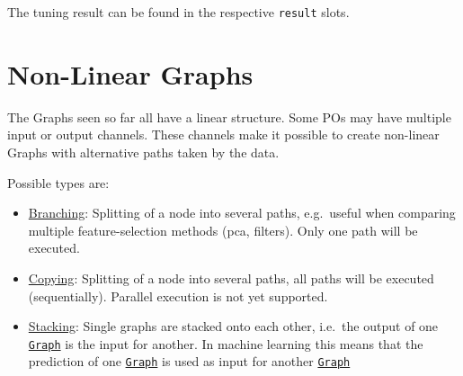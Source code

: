 \documentclass[]{scrbook}
\newenvironment{Shaded}{\begin{snugshade}}{\end{snugshade}}
\newcommand{\KeywordTok}[1]{\textcolor[rgb]{0.13,0.29,0.53}{\textbf{#1}}}
\newcommand{\NormalTok}[1]{#1}
\newcommand{\OperatorTok}[1]{\textcolor[rgb]{0.81,0.36,0.00}{\textbf{#1}}}
\newcommand{\StringTok}[1]{\textcolor[rgb]{0.31,0.60,0.02}{#1}}
\providecommand{\tightlist}{%
  \setlength{\itemsep}{0pt}\setlength{\parskip}{0pt}}
\renewenvironment{Shaded} {\begin{snugshade}\small} {\end{snugshade}}
\begin{document}
\begin{Shaded}
\end{Shaded}

The tuning result can be found in the respective \texttt{result} slots.

\begin{Shaded}
\end{Shaded}

\hypertarget{pipe-nonlinear}{%
\section{Non-Linear Graphs}\label{pipe-nonlinear}}

The Graphs seen so far all have a linear structure.
Some POs may have multiple input or output channels.
These channels make it possible to create non-linear Graphs with alternative paths taken by the data.

Possible types are:

\begin{itemize}
\tightlist
\item
  \protect\hyperlink{pipe-model-ensembles-branching}{Branching}:
  Splitting of a node into several paths, e.g.~useful when comparing multiple feature-selection methods (pca, filters).
  Only one path will be executed.
\item
  \protect\hyperlink{pipe-model-ensembles-copying}{Copying}:
  Splitting of a node into several paths, all paths will be executed (sequentially).
  Parallel execution is not yet supported.
\item
  \protect\hyperlink{pipe-model-ensembles-stacking}{Stacking}:
  Single graphs are stacked onto each other, i.e.~the output of one \href{https://mlr3pipelines.mlr-org.com/reference/Graph.html}{\texttt{Graph}} is the input for another.
  In machine learning this means that the prediction of one \href{https://mlr3pipelines.mlr-org.com/reference/Graph.html}{\texttt{Graph}} is used as input for another \href{https://mlr3pipelines.mlr-org.com/reference/Graph.html}{\texttt{Graph}}
\end{itemize}
\end{document}
